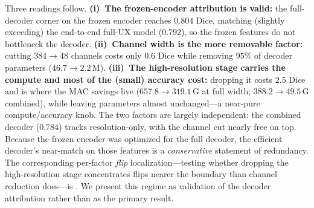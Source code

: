 \begin{table}[t]
\centering
\caption{Frozen-encoder $2\times2$ decoder factorial (3D UX-Net, BTCV, concatenation
skip). The encoder is the trained full-UX encoder, frozen; only the decoder is trained.
Channel width and the high-resolution stage are varied independently.}
\label{tab:factorial}
\setlength{\tabcolsep}{4pt}
\end{table}

Three readings follow. \textbf{(i)~The frozen-encoder attribution is valid:} the
full-decoder corner on the frozen encoder reaches $0.804$ Dice, matching (slightly
exceeding) the end-to-end full-UX model ($0.792$), so the frozen features do not
bottleneck the decoder. \textbf{(ii)~Channel width is the more removable factor:}
cutting $384\!\rightarrow\!48$ channels costs only $0.6$ Dice while removing
$95\%$ of decoder parameters ($46.7\!\rightarrow\!2.2$\,M). \textbf{(iii)~The
high-resolution stage carries the compute and most of the (small) accuracy cost:}
dropping it costs $2.5$ Dice and is where the MAC savings live
($657.8\!\rightarrow\!319.1$\,G at full width; $388.2\!\rightarrow\!49.5$\,G combined),
while leaving parameters almost unchanged---a near-pure compute/accuracy knob. The two
factors are largely independent: the combined \method{} decoder ($0.784$) tracks
resolution-only, with the channel cut nearly free on top. Because the frozen encoder was
optimized for the full decoder, the efficient decoder's near-match on those features is a
\emph{conservative} statement of redundancy. The corresponding per-factor \emph{flip}
localization---testing whether dropping the high-resolution stage concentrates flips
nearer the boundary than channel reduction does---is . We present this regime as validation of the decoder
attribution rather than as the primary result.

